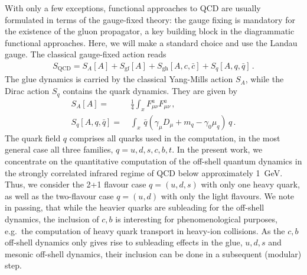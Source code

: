 \documentclass[aps,twocolumn,prd,superscriptaddress]{revtex4-2}
\begin{document}
With only a few exceptions, functional approaches to QCD are usually formulated in terms of the gauge-fixed theory: the gauge fixing is mandatory for the existence of the gluon propagator, a key building block in the diagrammatic functional approaches. Here, we will make a standard choice and use the Landau gauge. The classical gauge-fixed action reads
%
\begin{align}
	S_\textrm{QCD}= S_A[A] +S_\textrm{gf}[A] +S_\textrm{gh}[A,c, \bar c] +S_q[A,q,\bar q] \,.
	\label{eq:SQCD}
\end{align}
%
The glue dynamics is carried by the classical Yang-Mills action $S_A$, while the Dirac action $S_q$ contains the quark dynamics. They are given by
%
\begin{align}\nonumber
	S_A[A] =            & \, \frac14 \int_x F_{\mu\nu}^a F_{\mu\nu}^a\,,                           \\[1ex]
	S_q [A,q,\bar q]  = & \, \int_x \,\bar q \left( \gamma_\mu D_\mu+m_q-\gamma_0 \mu_q \right)\,q \,. 
	\label{eq:SA+Sq}
\end{align}
%
The quark field $q$ comprises all quarks used in the computation, in the most general case all three families, $q=u,d,s,c,b,t$.
In the present work, we concentrate on the quantitative computation of the off-shell quantum dynamics in the strongly correlated infrared regime of QCD below approximately \qty{1}{\GeV}. Thus, we consider the 2+1 flavour case $q=(u,d,s)$ with only one heavy quark, as well as the two-flavour case $q=(u,d)$ with only the light flavours. We note in passing, that while the heavier quarks are subleading for the off-shell dynamics, the inclusion of $c,b$ is interesting for phenomenological purposes, e.g.~the computation of heavy quark transport in heavy-ion collisions. As the $c,b$ off-shell dynamics only gives rise to subleading effects in the glue, $u,d,s$ and mesonic off-shell dynamics, their inclusion can be done in a subsequent (modular) step. 
\end{document}

